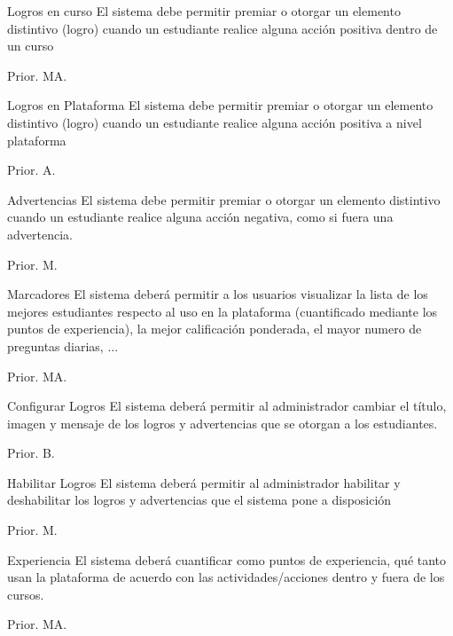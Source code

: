 
\clearpage

\begin{RF}{Logros en curso}{%
    El sistema debe permitir premiar o otorgar un elemento distintivo (logro) cuando un estudiante realice alguna acción positiva dentro de un curso}
    \item[] Prior. MA. %
\end{RF}

\begin{RF}{Logros en Plataforma}{%
    El sistema debe permitir premiar o otorgar un elemento distintivo (logro) cuando un estudiante realice alguna acción positiva a nivel plataforma}
    \item[] Prior. A. %
\end{RF}

\begin{RF}{Advertencias}{%
    El sistema debe permitir premiar o otorgar un elemento distintivo cuando un estudiante realice alguna acción negativa, como si fuera una advertencia.}
    \item[] Prior. M. %
\end{RF}

\begin{RF}{Marcadores}{%
    El sistema deberá permitir a los usuarios visualizar la lista de los mejores estudiantes respecto al uso en la plataforma (cuantificado mediante los puntos de experiencia), la mejor calificación ponderada, el mayor numero de preguntas diarias, ...}
    \item[] Prior. MA. %
\end{RF}

\begin{RF}{Configurar Logros}{%
    El sistema deberá permitir al administrador cambiar el título, imagen y mensaje de los logros y advertencias que se otorgan a los estudiantes.}
    \item[] Prior. B. %
\end{RF}

\begin{RF}{Habilitar Logros}{%
    El sistema deberá permitir al administrador habilitar y deshabilitar los logros y advertencias que el sistema pone a disposición}
    \item[] Prior. M. %
\end{RF}

\begin{RF}{Experiencia}{%
    El sistema deberá cuantificar como puntos de experiencia, qué tanto usan la plataforma de acuerdo con las actividades/acciones dentro y fuera de los cursos. }
    \item[] Prior. MA. %
\end{RF}

